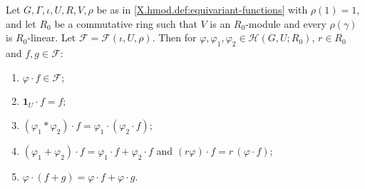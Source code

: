 Let $G,\Gamma,\iota,U,R,V,\rho$ be as in \cref{X.hmod.def:equivariant-functions} with $\rho(1)=1$, and let $R_0$ be a commutative ring such
that $V$ is an $R_0$-module and every $\rho(\gamma)$ is $R_0$-linear. Let $\mathcal F=\mathcal F(\iota,U,\rho)$. Then for
$\varphi,\varphi_1,\varphi_2\in\mathcal H(G,U;R_0)$, $r\in R_0$ and $f,g\in\mathcal F$:
\begin{enumerate}[label=(\alph*)]
\item $\varphi\cdot f\in\mathcal F$;
\item $\mathbf 1_U\cdot f=f$;
\item $(\varphi_1*\varphi_2)\cdot f=\varphi_1\cdot(\varphi_2\cdot f)$;
\item $(\varphi_1+\varphi_2)\cdot f=\varphi_1\cdot f+\varphi_2\cdot f$ and $(r\varphi)\cdot f=r\,(\varphi\cdot f)$;
\item $\varphi\cdot(f+g)=\varphi\cdot f+\varphi\cdot g$.
\end{enumerate}
